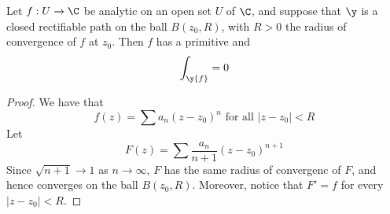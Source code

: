 \begin{lemma}\label{4.3.6}
    Let $f:U \xrightarrow{} \C$ be analytic on an open set $U$ of  $\C$, and
    suppose that $\y$ is a closed rectifiable path on the ball $B(z_0,R)$, with
    $R>0$ the radius of convergence of $f$ at $z_0$. Then $f$ has a primitive
    and
    \begin{equation*}
        \int_\y{f}=0
    \end{equation*}
\end{lemma}
\begin{proof}
    We have that
    \begin{equation*}
        f(z)=\sum{a_n(z-z_0)^n} \text{ for all } |z-z_0|<R
    \end{equation*}
    Let
    \begin{equation*}
        F(z)=\sum{\frac{a_n}{n+1}(z-z_0)^{n+1}}
    \end{equation*}
    Since $\sqrt{n+1} \xrightarrow{} 1$ as $n \xrightarrow{} \infty$, $F$ has
    the same radius of convergenc of  $F$, and hence converges on the ball
    $B(z_0,R)$. Moreover, notice that $F'=f$ for every  $|z-z_0|<R$.
\end{proof}
